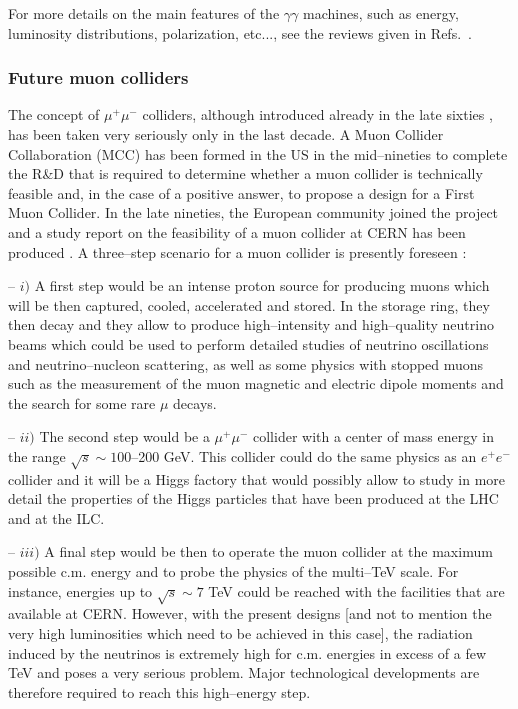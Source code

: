 For more details on the main features of the $\gamma \gamma$ machines, such
as energy, luminosity distributions, polarization, etc...,  see the  
reviews given in Refs.~\cite{gamma-Rev-TESLA,gamma-Rev-NLC,gamma-Jose}.

\subsubsection{Future muon colliders}

The concept of $\mu^+\mu^-$ colliders, although introduced already in the late
sixties \cite{mu-Budker}, has been taken very seriously only in the last
decade. A Muon Collider Collaboration (MCC) \cite{mu-machine,mu-machine1} has 
been
formed in the US in the mid--nineties to complete the R\&D that is required to
determine whether a muon collider is technically feasible and, in the case of a
positive answer, to propose a design for a First Muon Collider. In the
late nineties, the European community joined the project and a study report on
the feasibility of a muon collider at CERN has been produced
\cite{mu-machine2}. A three--step scenario for a muon collider is presently
foreseen \cite{mu-machine1,mu-machine2}:\s 

-- $i)$ A first step would be an intense proton source for producing muons 
which will be then captured, cooled, accelerated and stored. In the 
storage ring, they then decay and they allow to produce high--intensity 
and high--quality neutrino beams which could be used to perform detailed studies
of neutrino oscillations and neutrino--nucleon scattering, as well as some
physics with stopped muons such as the measurement of the muon magnetic and 
electric dipole moments and the search for some rare $\mu$ decays.\s  

-- $ii)$ The second step would be a $\mu^+ \mu^-$ collider with a center of 
mass energy in the range $\sqrt{s} \sim 100$--200 GeV. This collider could do 
the same physics as an $e^+e^-$ collider and it will be a Higgs factory 
that would possibly allow to study in more detail the properties of the Higgs 
particles that have been produced at the LHC and at the ILC.\s

-- $iii)$ A final step would be then to operate the muon collider at the
maximum possible c.m. energy and to probe the physics of the multi--TeV scale. 
For instance, energies up to $\sqrt s \sim 7$ TeV could be reached with the 
facilities that are available at CERN. However, with the present designs [and 
not to mention the very high luminosities which need to be achieved in this 
case], the radiation induced by the neutrinos is extremely high for c.m. 
energies in excess of a few TeV and poses a very serious problem. Major 
technological developments are therefore required to reach this high--energy 
step.\s 

